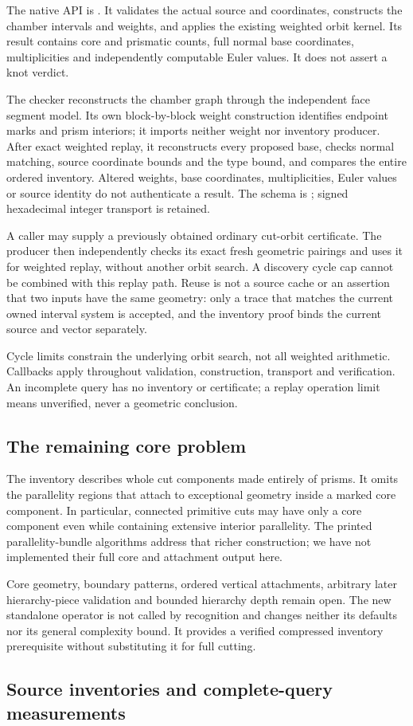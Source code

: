 The native API is . It validates the
actual source and coordinates, constructs the chamber intervals and
weights, and applies the existing weighted orbit kernel. Its result
contains core and prismatic counts, full normal base coordinates,
multiplicities and independently computable Euler values. It does not
assert a knot verdict.

The checker reconstructs the chamber graph through the independent face
segment model. Its own block-by-block weight construction identifies
endpoint marks and prism interiors; it imports neither weight nor inventory
producer. After exact weighted replay, it reconstructs every proposed base,
checks normal matching, source coordinate bounds and the type bound, and
compares the entire ordered inventory. Altered weights, base coordinates,
multiplicities, Euler values or source identity do not authenticate a result.
The schema is ; signed hexadecimal
integer transport is retained.

A caller may supply a previously obtained ordinary cut-orbit certificate.
The producer then independently checks its exact fresh geometric pairings
and uses it for weighted replay, without another orbit search. A discovery
cycle cap cannot be combined with this replay path. Reuse is not a source
cache or an assertion that two inputs have the same geometry: only a trace
that matches the current owned interval system is accepted, and the inventory
proof binds the current source and vector separately.

Cycle limits constrain the underlying orbit search, not all weighted
arithmetic. Callbacks apply throughout validation, construction, transport
and verification. An incomplete query has no inventory or certificate;
a replay operation limit means unverified, never a geometric conclusion.

\subsection{The remaining core problem}

The inventory describes whole cut components made entirely of prisms. It
omits the parallelity regions that attach to exceptional geometry inside
a marked core component. In particular, connected primitive cuts may have
only a core component even while containing extensive interior parallelity.
The printed parallelity-bundle algorithms address that richer construction;
we have not implemented their full core and attachment output here.

Core geometry, boundary patterns, ordered vertical attachments, arbitrary
later hierarchy-piece validation and bounded hierarchy depth remain open.
The new standalone operator is not called by recognition and changes neither
its defaults nor its general complexity bound. It provides a verified
compressed inventory prerequisite without substituting it for full cutting.

\subsection{Source inventories and complete-query measurements}

